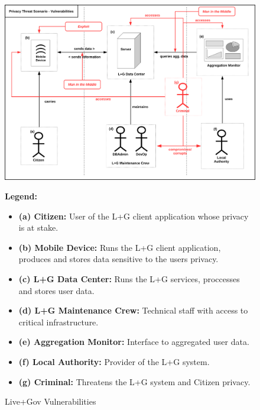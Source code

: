 \begin{figure}
\centering
\includegraphics[width=\textwidth]{diagrams/png/scenario-vulnerabilities.png}

\begin{flushleft}
\scriptsize
\textbf{Legend:}

\begin{itemize}
\itemsep1pt\parskip0pt
\item
  \textbf{(a) Citizen:} User of the L+G client application whose privacy
  is at stake.
\item
  \textbf{(b) Mobile Device:} Runs the L+G client application, produces
  and stores data sensitive to the users privacy.
\item
  \textbf{(c) L+G Data Center:} Runs the L+G services, proccesses and
  stores user data.
\item
  \textbf{(d) L+G Maintenance Crew:} Technical staff with access to
  critical infrastructure.
\item
  \textbf{(e) Aggregation Monitor:} Interface to aggregated user data.
\item
  \textbf{(f) Local Authority:} Provider of the L+G system.
\item
  \textbf{(g) Criminal:} Threatens the L+G system and Citizen privacy.
\end{itemize}
\end{flushleft}

\caption{Live+Gov Vulnerabilities}
\label{figure:Live+Gov Vulnerabilities}
\end{figure}
